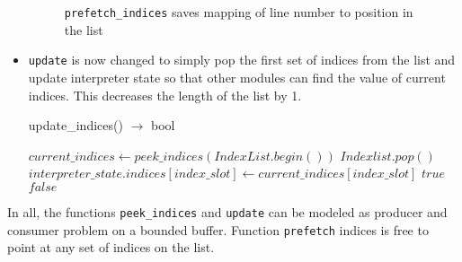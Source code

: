 \begin{itemize}
\begin{figure}[h]
    \caption{\texttt{prefetch\_indices} saves mapping of line number to position in the list} \label{fig:prefetch_indices map}
  \end{figure}

\item \texttt{update} is now changed to simply pop the first set of indices from
  the list and update interpreter state so that other modules can find the value
  of current indices. This decreases the length of the list by 1.
  \begin{algorithm}  {update\_indices() $\rightarrow$ bool}
    \singlespacing

    \begin{algorithmic}[1]
      \State $current\_indices \gets peek\_indices(IndexList.begin())$
      \State $Indexlist.pop()$
      \State $interpreter\_state.indices[index\_slot] \gets current\_indices[index\_slot]$
      \EndFor
      \State \Return $true$
      \Else
      \State \Return $false$
      \EndIf
      \EndFunction
    \end{algorithmic}
  \end{algorithm}
\end{itemize}

In all, the functions \texttt{peek\_indices} and \texttt{update} can be modeled
as producer and consumer problem on a bounded buffer. Function \texttt{prefetch}
indices is free to point at any set of indices on the list.

